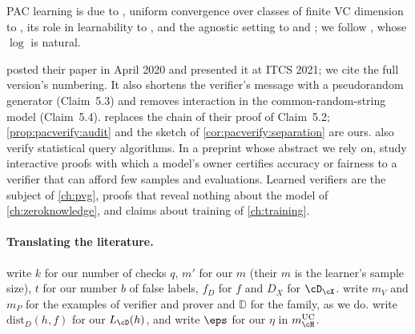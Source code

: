 \begin{refsection}
\begin{exercises}
\end{exercises}

\notesandrefs
PAC learning is due to \textcite{Valiant1984}, uniform convergence over classes of finite VC dimension to \textcite{VapnikChervonenkis1971}, its role in learnability to \textcite{BlumerEtAl1989}, and the agnostic setting to \textcite{Haussler1992} and \textcite{KearnsSchapireSellie1994}; we follow \textcite{ShalevShwartzBenDavid2014}, whose $\log$ is natural.

\Textcite{GoldwasserEtAl2021} posted their paper in April 2020 and presented it at ITCS 2021; we cite the full version's numbering. It also shortens the verifier's message with a pseudorandom generator (Claim~5.3) and removes interaction in the common-random-string model (Claim~5.4).  replaces the chain of their proof of Claim~5.2; \cref{prop:pacverify:audit} and the sketch of \cref{cor:pacverify:separation} are ours. \Textcite{MutrejaShafer2023} also verify statistical query algorithms. In a preprint whose abstract we rely on, \textcite{CouteauMelissarisParis2026} study interactive proofs with which a model's owner certifies accuracy or fairness to a verifier that can afford few samples and evaluations. Learned verifiers are the subject of \cref{ch:pvg}, proofs that reveal nothing about the model of \cref{ch:zeroknowledge}, and claims about training of \cref{ch:training}.

\paragraph{Translating the literature.} \Textcite{GoldwasserEtAl2021} write $k$ for our number of checks $q$, $m'$ for our $m$ (their $m$ is the learner's sample size), $t$ for our number $b$ of false labels, $f_D$ for $f$ and $D_X$ for $\cD_\cX$. \Textcite{MutrejaShafer2023} write $m_V$ and $m_P$ for the examples of verifier and prover and $\mathbb D$ for the family, as we do. \Textcite{GurEtAl2024} write $\mathrm{dist}_D(h,f)$ for our $L_\cD(h)$, and \textcite{ShalevShwartzBenDavid2014} write $\eps$ for our $\eta$ in $m^{\mathrm{UC}}_{\cH}$.

\printchapterbib
\end{refsection}
